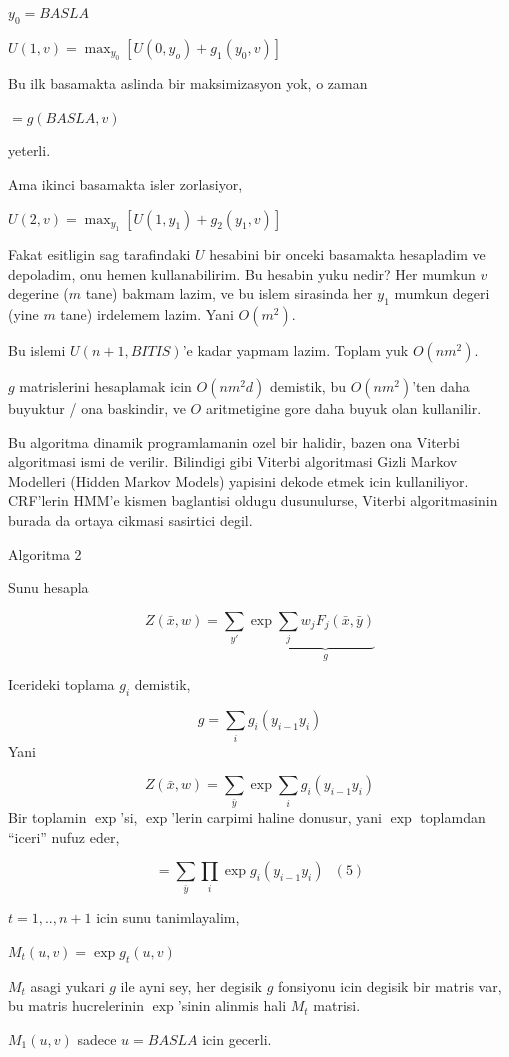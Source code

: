 \documentclass[12pt,fleqn]{article}\usepackage{../common}
\begin{document}
$y_0 = BASLA$

$U(1,v) = \max_{y_0} [ U(0,y_o) + g_1(y_0,v)]$

Bu ilk basamakta aslinda bir maksimizasyon yok, o zaman 

$ = g(BASLA,v)$

yeterli. 

Ama ikinci basamakta isler zorlasiyor, 

$U(2,v) = \max_{y_1} [ U(1,y_1) + g_2(y_1,v) ]$

Fakat esitligin sag tarafindaki $U$ hesabini bir onceki basamakta
hesapladim ve depoladim, onu hemen kullanabilirim. Bu hesabin yuku nedir? 
Her mumkun $v$ degerine ($m$ tane) bakmam lazim, ve bu islem sirasinda her
$y_1$ mumkun degeri (yine $m$ tane) irdelemem lazim. Yani $O(m^2)$. 

Bu islemi $U(n+1, BITIS)$'e kadar yapmam lazim. Toplam yuk $O(nm^2)$. 

$g$ matrislerini hesaplamak icin $O(nm^2d)$ demistik, bu  $O(nm^2)$'ten
daha buyuktur / ona baskindir, ve $O$ aritmetigine gore daha buyuk olan 
kullanilir. 

Bu algoritma dinamik programlamanin ozel bir halidir, bazen ona Viterbi
algoritmasi ismi de verilir. Bilindigi gibi Viterbi algoritmasi Gizli
Markov Modelleri (Hidden Markov Models) yapisini dekode etmek icin
kullaniliyor. CRF'lerin HMM'e kismen baglantisi oldugu dusunulurse, Viterbi
algoritmasinin burada da ortaya cikmasi sasirtici degil. 

Algoritma 2

Sunu hesapla

$$Z(\bar{x},w) = \sum_{y'} \exp 
\underbrace{\sum_j w_j F_j(\bar{x},\bar{y})}_{g}
$$

Icerideki toplama $g_i$ demistik, 

$$ g = \sum_i g_i(y_{i-1}y_i) $$
Yani


$$Z(\bar{x},w) = 
\sum_{\bar{y}} \exp 
\sum_i g_i(y_{i-1}y_i) 
$$
Bir toplamin $\exp$'si, $\exp$'lerin carpimi haline donusur, yani $\exp$
toplamdan ``iceri'' nufuz eder, 

$$
 = \sum_{\bar{y}} \prod_i \exp  g_i(y_{i-1}y_i) 
\ \ \ (5)
$$

$t=1,..,n+1$ icin sunu tanimlayalim,

$M_t(u,v) = \exp g_t(u,v)$

$M_t$ asagi yukari $g$ ile ayni sey, her degisik $g$ fonsiyonu icin degisik
bir matris var, bu matris hucrelerinin $\exp$'sinin alinmis hali $M_t$ matrisi.

$M_1(u,v)$ sadece $u=BASLA$ icin gecerli. 
\end{document}
